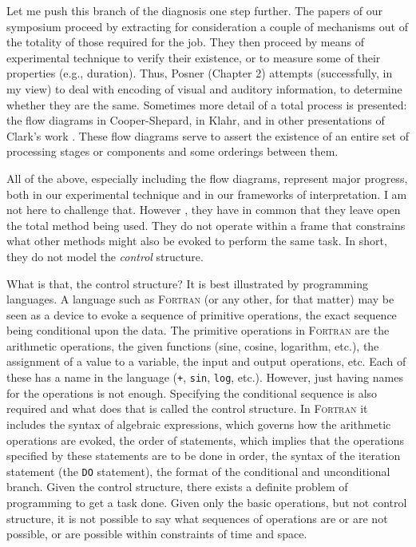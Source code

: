 \documentclass{paper}
\newcounter{oldpagecounter}
\newcommand\oldpage{\stepcounter{oldpagecounter}\marginpar{\footnotesize{\textcolor{mygrey}{pg. \arabic{oldpagecounter}}}}}
\begin{document}
Let me push this branch of the diagnosis one step further. The papers of our symposium proceed by extracting for consideration a couple of mechanisms out of the totality of those required for the job. They then proceed by means of experimental technique to verify their existence, or to measure some of their properties (e.g., duration). Thus, Posner (Chapter 2) attempts (successfully, in my view) to deal with encoding of visual and auditory information, to determine whether they are the same. Sometimes more detail of a total process is presented: the flow diagrams in Cooper-Shepard, in Klahr, and in other presentations of Clark's work \citep{ClarkChase1972}. These flow diagrams serve to assert the existence of an entire set of processing stages or components and some orderings between them. 

All of the above, especially including the flow diagrams, represent major progress, both in our experimental technique and in our frameworks of interpretation. I am not here to challenge that. However \oldpage, they have in common that they leave open the total method being used. They do not operate within a frame that constrains what other methods might also be evoked to perform the same task. In short, they do not model the \textit{control} structure.

What is that, the control structure? It is best illustrated by programming languages. A language such as \textsc{Fortran} (or any other, for that matter) may be seen as a device to evoke a sequence of primitive operations, the exact sequence being conditional upon the data. The primitive operations in \textsc{Fortran} are the arithmetic operations, the given functions (sine, cosine, logarithm, etc.), the assignment of a value to a variable, the input and output operations, etc. Each of these has a name in the language (\texttt{+}, \texttt{sin}, \texttt{log}, etc.). However, just having names for the operations is not enough. Specifying the conditional sequence is also required and what does that is called the control structure. In \textsc{Fortran} it includes the syntax of algebraic expressions, which governs how the arithmetic operations are evoked, the order of statements, which implies that the operations specified by these statements are to be done in order, the syntax of the iteration statement (the \texttt{DO} statement), the format of the conditional and unconditional branch. Given the control structure, there exists a definite problem of programming to get a task done. Given only the basic operations, but not control structure, it is not possible to say what sequences of operations are or are not possible, or are possible within constraints of time and space.
\end{document}
